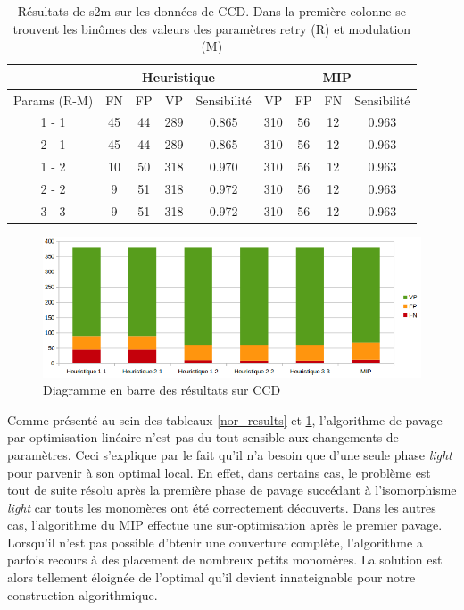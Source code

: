 \begin{table}[!ht]
  \centering
  \begin{tabular}{|c|c|c|c|c|c|c|c|c|}
    \hline
    & \multicolumn{4}{c|}{Heuristique} & \multicolumn{4}{c|}{MIP} \\
    \hline
    Params (R-M) & FN & FP & VP & Sensibilité & VP & FP & FN & Sensibilité \\
    \hline
    1 - 1 & 45 & 44 & 289 & 0.865 & 310 & 56 & 12 & 0.963 \\
    \hline
    2 - 1 & 45 & 44 & 289 & 0.865 & 310 & 56 & 12 & 0.963 \\
    \hline
    1 - 2 & 10 & 50 & 318 & 0.970 & 310 & 56 & 12 & 0.963 \\
    \hline
    2 - 2 & 9 & 51 & 318 & 0.972 & 310 & 56 & 12 & 0.963 \\
    \hline
    3 - 3 & 9 & 51 & 318 & 0.972 & 310 & 56 & 12 & 0.963 \\
    \hline
  \end{tabular}
  \caption{\label{ccd_results}Résultats de s2m sur les données de CCD.
  Dans la première colonne se trouvent les binômes des valeurs des paramètres retry (R) et modulation (M)}
\end{table}

\begin{figure}[!ht]
  \begin{center}
    \includegraphics[width=450px]{Figures/s2m/results/CCD.png}
    \caption{\label{ccd_graph}Diagramme en barre des résultats sur CCD}
  \end{center}
\end{figure}


Comme présenté au sein des tableaux \ref{nor_results} et \ref{ccd_results}, l'algorithme de pavage par optimisation linéaire n'est pas du tout sensible aux changements de paramètres.
Ceci s'explique par le fait qu'il n'a besoin que d'une seule phase \textit{light} pour parvenir à son optimal local.
En effet, dans certains cas, le problème est tout de suite résolu après la première phase de pavage succédant à l'isomorphisme \textit{light} car touts les monomères ont été correctement découverts.
Dans les autres cas, l'algorithme du MIP effectue une sur-optimisation après le premier pavage.
Lorsqu'il n'est pas possible d'btenir une couverture complète, l'algorithme a parfois recours à des placement de nombreux petits monomères.
La solution est alors tellement éloignée de l'optimal qu'il devient innateignable pour notre construction algorithmique.

